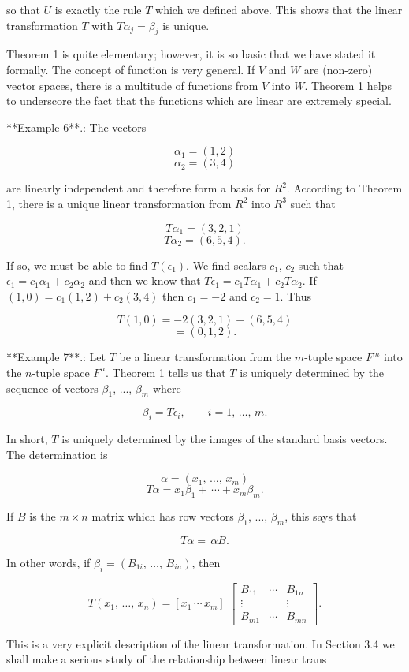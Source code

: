so that \(U\) is exactly the rule \(T\) which we defined above. This shows that the linear transformation \(T\) with \(T\alpha_{j}=\beta_{j}\) is unique.

Theorem 1 is quite elementary; however, it is so basic that we have stated it formally. The concept of function is very general. If \(V\) and \(W\) are (non-zero) vector spaces, there is a multitude of functions from \(V\) into \(W\). Theorem 1 helps to underscore the fact that the functions which are linear are extremely special.

**Example 6**.: The vectors

\[\alpha_{1} = (1,2)\] \[\alpha_{2} = (3,4)\]

are linearly independent and therefore form a basis for \(R^{2}\). According to Theorem 1, there is a unique linear transformation from \(R^{2}\) into \(R^{3}\) such that

\[T\alpha_{1} = (3,2,1)\] \[T\alpha_{2} = (6,5,4).\]

If so, we must be able to find \(T(\epsilon_{1})\). We find scalars \(c_{1}\), \(c_{2}\) such that \(\epsilon_{1}=c_{1}\alpha_{1}+c_{2}\alpha_{2}\) and then we know that \(T\epsilon_{1}=c_{1}T\alpha_{1}+c_{2}T\alpha_{2}\). If \((1,0)=c_{1}(1,2)+c_{2}(3,4)\) then \(c_{1}=-2\) and \(c_{2}=1\). Thus

\[T(1,0) = -2(3,2,1)+(6,5,4)\] \[= (0,1,2).\]

**Example 7**.: Let \(T\) be a linear transformation from the \(m\)-tuple space \(F^{m}\) into the \(n\)-tuple space \(F^{n}\). Theorem 1 tells us that \(T\) is uniquely determined by the sequence of vectors \(\beta_{1}\), ..., \(\beta_{m}\) where

\[\beta_{i}=T\epsilon_{i},\qquad i=1,\,\ldots,\,m.\]

In short, \(T\) is uniquely determined by the images of the standard basis vectors. The determination is

\[\alpha = (x_{1},\,\ldots,\,x_{m})\] \[T\alpha = x_{1}\beta_{1}+\,\cdots+x_{m}\beta_{m}.\]

If \(B\) is the \(m\times n\) matrix which has row vectors \(\beta_{1}\), ..., \(\beta_{m}\), this says that

\[T\alpha=\,\alpha B.\]

In other words, if \(\beta_{i}=(B_{1i},\,\ldots,\,B_{in})\), then

\[T(x_{1},\,\ldots,\,x_{n})=[x_{1}\,\cdots\,x_{m}]\,\,\begin{bmatrix}B_{11}& \cdots&B_{1n}\\ \vdots&&\vdots\\ B_{m1}&\cdots&B_{mn}\end{bmatrix}.\]

This is a very explicit description of the linear transformation. In Section 3.4 we shall make a serious study of the relationship between linear trans 